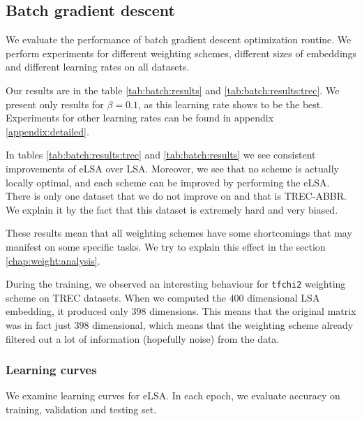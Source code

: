     \subsection{Batch gradient descent}
    We evaluate the performance of batch gradient descent optimization routine.
    We perform experiments for different weighting schemes, different sizes of embeddings and different learning rates on all datasets.

    Our results are in the table \ref{tab:batch:results} and \ref{tab:batch:results:trec}.
    We present only results for $\beta=0.1$, as this learning rate shows to be the best. 
    Experiments for other learning rates can be found in appendix \ref{appendix:detailed}.
    
    

    In tables \ref{tab:batch:results:trec} and \ref{tab:batch:results} we see consistent improvements of eLSA over LSA.
    Moreover, we see that no scheme is actually locally optimal, and each scheme can be improved by performing the eLSA.
    There is only one dataset that we do not improve on and that is TREC-ABBR.
    We explain it by the fact that this dataset is extremely hard and very biased. 
    
    These results mean that all weighting schemes have some shortcomings 
    that may manifest on some specific tasks.  
    We try to explain this effect in the section \ref{chap:weight:analysis}.
    
    During the training, we observed an interesting behaviour for \texttt{tfchi2} weighting scheme on TREC datasets.
    When we computed the $400$ dimensional LSA embedding, it produced only $398$ dimensions. 
    This means that the original matrix was in fact just $398$ dimensional, 
    which means that the weighting scheme already filtered out a lot of information (hopefully noise) from the data. 

    \subsubsection{Learning curves}
    We examine learning curves for eLSA.
    In each epoch, we evaluate accuracy on training, validation and testing set.
    
